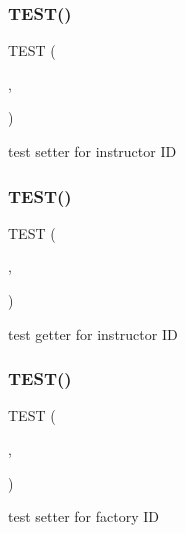 \subsubsection{\texorpdfstring{T\+E\+S\+T()}{TEST()}\hspace{0.1cm}{\footnotesize\ttfamily [7/54]}}
{\footnotesize\ttfamily T\+E\+ST (\begin{DoxyParamCaption}\item[{game\+Test}]{,  }\item[{set\+Instr\+Id\+Test}]{ }\end{DoxyParamCaption})}

test setter for instructor ID \mbox{\label{group__group2_gaf1f4baf7661402e53fb1f283df721960}} 
\subsubsection{\texorpdfstring{T\+E\+S\+T()}{TEST()}\hspace{0.1cm}{\footnotesize\ttfamily [8/54]}}
{\footnotesize\ttfamily T\+E\+ST (\begin{DoxyParamCaption}\item[{game\+Test}]{,  }\item[{get\+Instr\+Id\+Test}]{ }\end{DoxyParamCaption})}

test getter for instructor ID \mbox{\label{group__group2_ga0387a0f6fe5a24329ca94f46d1b1c4cd}} 
\subsubsection{\texorpdfstring{T\+E\+S\+T()}{TEST()}\hspace{0.1cm}{\footnotesize\ttfamily [9/54]}}
{\footnotesize\ttfamily T\+E\+ST (\begin{DoxyParamCaption}\item[{game\+Test}]{,  }\item[{set\+P\+Fact\+Id\+Test}]{ }\end{DoxyParamCaption})}

test setter for factory ID \mbox{\label{group__group2_ga4bfec1cf153e09237bd237bfc7de2f15}} 
